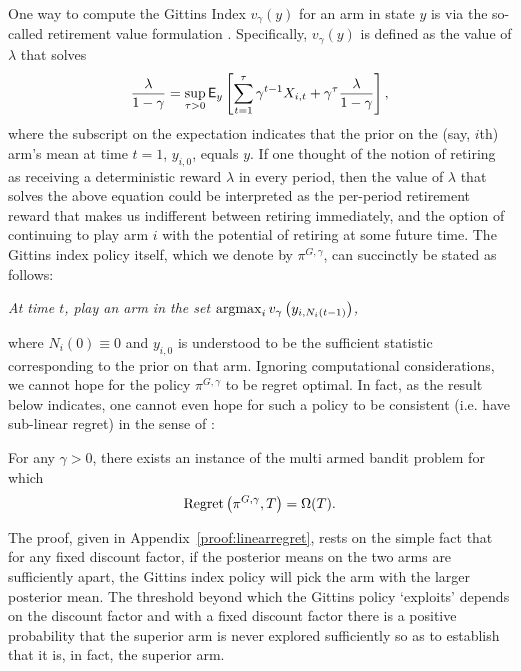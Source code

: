 One way to compute the Gittins Index $v_\gamma(y)$ for an arm in state $y$ is via the so-called retirement value formulation \citep{whittle1980multi}. Specifically, $v_\gamma(y)$ is defined as the value of $\lambda$ that solves
\begin{equation} \label{eqn:gittins_index}
\frac{\lambda}{1-\gamma} = \sup_{\tau > 0}\mathsf{E}_{y}\left[\sum_{t=1}^{\tau} \gamma^{t-1} X_{i,t} + \gamma^{\tau} \frac{\lambda}{1-\gamma}
\right],
\end{equation}
where the subscript on the expectation indicates that the prior on the (say, $i$th) arm's mean at time $t=1$, $y_{i,0}$, equals $y$. If one thought of the notion of retiring as receiving a deterministic reward $\lambda$ in every period, then the value of $\lambda$ that solves the above equation could be interpreted as the per-period retirement reward that makes us indifferent between retiring immediately, and the option of continuing to play arm $i$ with the potential of retiring at some future time. The Gittins index policy itself, which we denote by $\pi^{G,\gamma}$, can succinctly be stated as follows: 
\begin{center}
{\em At time $t$, play an arm in the set 
$\operatorname*{\mathrm{argmax}}_{i} v_\gamma
\left(
y_{i,N_i(t-1)}
\right)$,
} 
\end{center}
where $N_i(0) \equiv 0$ and $y_{i,0}$ is understood to be the sufficient statistic corresponding to the prior on that arm. Ignoring computational considerations, we cannot hope for the policy $\pi^{G,\gamma}$ to be regret optimal. In fact, as the result below indicates, one cannot even hope for such a policy to be consistent (i.e. have sub-linear regret) in the sense of \cite{lai1985asymptotically}:
\begin{lemma}
\label{le:linearregret}
	For any $\gamma > 0$, there exists an instance of the multi armed bandit problem for which 
	\[
	{\rm Regret}\left(
	\pi^{G,\gamma},T
	\right)
	= 
	\Omega(T).
	\]
\end{lemma}
The proof, given in Appendix~\ref{proof:linearregret}, rests on the simple fact that for any fixed discount factor, if the posterior means on the two arms are sufficiently apart, the Gittins index policy will pick the arm with the larger posterior mean. The threshold beyond which the Gittins policy `exploits' depends on the discount factor and with a fixed discount factor there is a positive probability that the superior arm is never explored sufficiently so as to establish that it is, in fact, the superior arm. 

